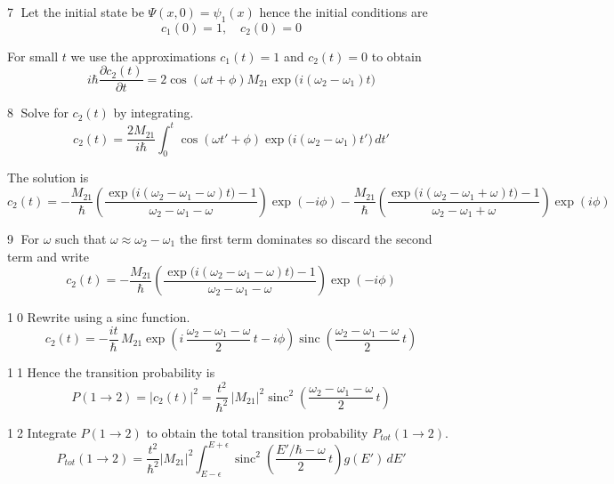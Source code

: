 \documentclass[12pt]{article}
\begin{document}
\textcircled{\scriptsize7}
Let the initial state be $\Psi(x,0)=\psi_1(x)$ hence the initial conditions are
\begin{equation*}
c_1(0)=1,\quad c_2(0)=0
\end{equation*}

For small $t$ we use the approximations $c_1(t)=1$ and $c_2(t)=0$ to obtain
\begin{equation*}
i\hbar\frac{\partial c_2(t)}{\partial t}
=2\cos(\omega t+\phi)M_{21}\exp\bigl(i(\omega_2-\omega_1)t\bigr)
\end{equation*}

\textcircled{\scriptsize8}
Solve for $c_2(t)$ by integrating.
\begin{equation*}
c_2(t)=\frac{2M_{21}}{i\hbar}
\int_0^t\cos(\omega t'+\phi)\exp\bigl(i(\omega_2-\omega_1)t'\bigr)\,dt'
\end{equation*}

The solution is
\begin{equation*}
c_2(t)
=-\frac{M_{21}}{\hbar}
\left(
\frac{\exp\bigl(i(\omega_2-\omega_1-\omega) t\bigr)-1}{\omega_2-\omega_1-\omega}
\right)\exp(-i\phi)
-\frac{M_{21}}{\hbar}
\left(
\frac{\exp\bigl(i(\omega_2-\omega_1+\omega) t\bigr)-1}{\omega_2-\omega_1+\omega}
\right)\exp(i\phi)
\end{equation*}

\textcircled{\scriptsize9}
For $\omega$ such that $\omega\approx\omega_2-\omega_1$ the first term
dominates so discard the second term and write
\begin{equation*}
c_2(t)=-\frac{M_{21}}{\hbar}
\left(
\frac{\exp\bigl(i(\omega_2-\omega_1-\omega) t\bigr)-1}{\omega_2-\omega_1-\omega}
\right)\exp(-i\phi)
\end{equation*}

\textcircled{\scriptsize10}
Rewrite using a sinc function.
\begin{equation*}
c_2(t)=-\frac{it}{\hbar}\,M_{21}
\exp\left(i\,\frac{\omega_2-\omega_1-\omega}{2}\,t-i\phi\right)
\operatorname{sinc}\left(\frac{\omega_2-\omega_1-\omega}{2}\,t\right)
\end{equation*}

\textcircled{\scriptsize11}
Hence the transition probability is
\begin{equation*}
P(1\rightarrow2)=|c_2(t)|^2=\frac{t^2}{\hbar^2}\,|M_{21}|^2
\operatorname{sinc}^2\left(\frac{\omega_2-\omega_1-\omega}{2}\,t\right)
\end{equation*}

\textcircled{\scriptsize12}
Integrate $P(1\rightarrow2)$ to obtain the total transition probability
$P_{tot}(1\rightarrow2)$.
\begin{equation*}
P_{tot}(1\rightarrow2)=\frac{t^2}{\hbar^2}|M_{21}|^2
\int_{E-\epsilon}^{E+\epsilon}
\operatorname{sinc}^2\left(\frac{E'/\hbar-\omega}{2}\,t\right)
g(E')\,dE'
\end{equation*}
\end{document}
